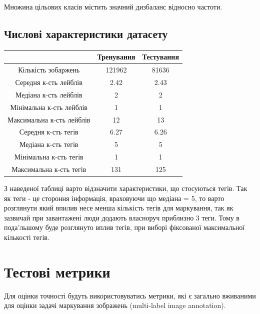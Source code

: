 \documentclass{udstu}
\begin{document}
Множина цільових класів містить значний дизбаланс відносно частоти.

\clearpage

\subsection{Числові характеристики датасету}

\begin{center}
\begin{tabular}{ccc}
		\toprule[2pt]
           & Тренування & Тестування \\
        \midrule
        Кількість зобаржень & 121962  & 81636 \\
        Середня к-сть лейблів & 2.42  & 2.43 \\
        Медіана к-сть лейблів & 2  & 2 \\
        Мінімальна к-сть лейблів & 1  & 1 \\
        Максимальна к-сть лейблів & 12  & 13 \\
        Середня к-сть тегів & 6.27  & 6.26 \\
        Медіана к-сть тегів & 5  & 5 \\
        Мінімальна к-сть тегів & 1  & 1 \\
        Максимальна к-сть тегів & 131  & 125 \\
        \bottomrule[2pt]
\end{tabular}
\end{center}

З наведеної таблиці варто відзначити характеристики, що стосуються тегів. Так як теги - це
стороння інформація, враховуючи що медіана = 5, то варто розглянути який впилив несе менша кількість
тегів для маркування, так як зазвичай при завантажені люди додають власноруч приблизно 3 теги.
Тому в пода'льшому буде розглянуто вплив тегів, при виборі фіксованої максимальної кількості тегів.

\clearpage


\section{Тестові метрики}
\label{metrics}

Для оцінки точності будуть використовуватись метрики, які є загально вживаними для оцінки
задачі маркування зображень (multi-label image annotation).
\end{document}
